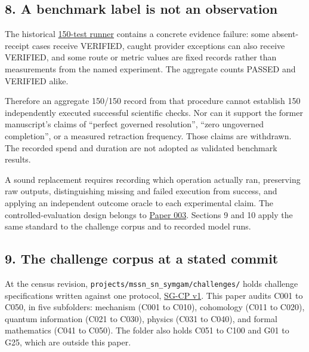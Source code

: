 \documentclass[
  11pt,
]{article}
\begin{document}
\hypertarget{a-benchmark-label-is-not-an-observation}{%
\subsection{8. A benchmark label is not an
observation}\label{a-benchmark-label-is-not-an-observation}}

The historical
\href{https://github.com/dbccpage/the_symbol_game/blob/52cb5457f6c485ba548cfd292f6012a941ed22cf/projects/mssn_sn_symgam/challenges/run_150_tests_suite.py}{150-test
runner} contains a concrete evidence failure: some absent-receipt cases
receive VERIFIED, caught provider exceptions can also receive VERIFIED,
and some route or metric values are fixed records rather than
measurements from the named experiment. The aggregate counts PASSED and
VERIFIED alike.

Therefore an aggregate 150/150 record from that procedure cannot
establish 150 independently executed successful scientific checks. Nor
can it support the former manuscript's claims of ``perfect governed
resolution'', ``zero ungoverned completion'', or a measured retraction
frequency. Those claims are withdrawn. The recorded spend and duration
are not adopted as validated benchmark results.

A sound replacement requires recording which operation actually ran,
preserving raw outputs, distinguishing missing and failed execution from
success, and applying an independent outcome oracle to each experimental
claim. The controlled-evaluation design belongs to
\href{https://github.com/dbccpage/the_symbol_game/blob/23893fc44162555fa12ceda3e1665982e3d7a14e/atlas/coda_atlas/symbol_game/003_pfp_host_admitted_failure_detectors/paper.md}{Paper
003}. Sections 9 and 10 apply the same standard to the challenge corpus
and to recorded model runs.

\hypertarget{the-challenge-corpus-at-a-stated-commit}{%
\subsection{9. The challenge corpus at a stated
commit}\label{the-challenge-corpus-at-a-stated-commit}}

At the census revision,
\nolinkurl{projects/mssn_sn_symgam/challenges/} holds
challenge specifications written against one protocol,
\href{https://github.com/dbccpage/the_symbol_game/blob/a623568eb0f853b968bc419bf06dfc6af256ab02/projects/mssn_sn_symgam/challenges/01_challenge_protocol.md}{SG-CP
v1}. This paper audits C001 to C050, in five subfolders: mechanism (C001
to C010), cohomology (C011 to C020), quantum information (C021 to C030),
physics (C031 to C040), and formal mathematics (C041 to C050). The
folder also holds C051 to C100 and G01 to G25, which are outside this
paper.
\end{document}
